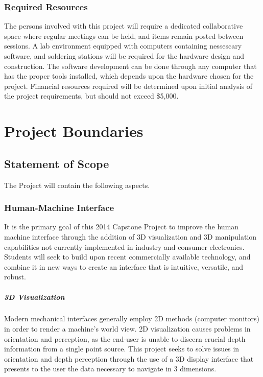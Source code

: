 \documentclass[11pt]{report}
\begin{document}
\subsection{Required Resources}
\par The persons involved with this project will require a dedicated collaborative space where regular meetings can be held, and items remain posted between sessions. A lab environment equipped with computers containing nessescary software, and soldering stations will be required for the hardware design and construction. The software development can be done through any computer that has the proper tools installed, which depends upon the hardware chosen for the project. Financial resources required will be determined upon initial analysis of the project requirements, but should not exceed \$5,000.

\chapter{Project Boundaries}
\section{Statement of Scope}
The Project will contain the following aspects.

\subsection{Human-Machine Interface}
\par It is the primary goal of this 2014 Capstone Project to improve the human machine interface through the addition of 3D visualization and 3D manipulation capabilities not currently implemented in industry and consumer electronics. Students will seek to build upon recent commercially available technology, and combine it in new ways to create an interface that is intuitive, versatile, and robust.

\paragraph{3D Visualization}
Modern mechanical interfaces generally employ 2D methods (computer monitors) in order to render a machine's world view. 2D visualization causes problems in orientation and perception, as the end-user is unable to discern crucial depth information from a single point source. This project seeks to solve issues in orientation and depth perception through the use of a 3D display interface that presents to the user the data necessary to navigate in 3 dimensions.
\end{document}

